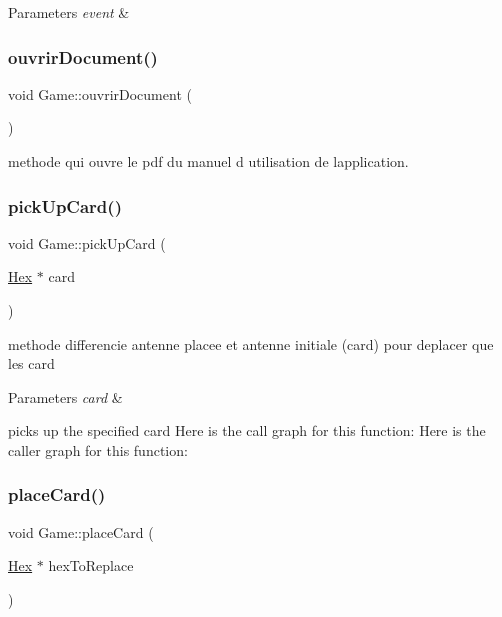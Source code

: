 \begin{DoxyParams}{Parameters}
{\em event} & \\
\hline
\end{DoxyParams}
\mbox{\label{class_game_a2891d0920da38ccdc2df9a4b441ba084}} 
\subsubsection{\texorpdfstring{ouvrirDocument()}{ouvrirDocument()}}
{\footnotesize\ttfamily void Game\+::ouvrir\+Document (\begin{DoxyParamCaption}{ }\end{DoxyParamCaption})}



methode qui ouvre le pdf du manuel d utilisation de l\textquotesingle{}application. 

\mbox{\label{class_game_af01f609e7ecc9681f63a8849eb82ef18}} 
\subsubsection{\texorpdfstring{pickUpCard()}{pickUpCard()}}
{\footnotesize\ttfamily void Game\+::pick\+Up\+Card (\begin{DoxyParamCaption}\item[{\mbox{\hyperlink{class_hex}{Hex}} $\ast$}]{card }\end{DoxyParamCaption})}



methode differencie antenne placee et antenne initiale (card) pour deplacer que les card 


\begin{DoxyParams}{Parameters}
{\em card} & \\
\hline
\end{DoxyParams}
picks up the specified card Here is the call graph for this function\+:
Here is the caller graph for this function\+:
\mbox{\label{class_game_a899968e870a05be0ca685138fbe12fda}} 
\subsubsection{\texorpdfstring{placeCard()}{placeCard()}}
{\footnotesize\ttfamily void Game\+::place\+Card (\begin{DoxyParamCaption}\item[{\mbox{\hyperlink{class_hex}{Hex}} $\ast$}]{hex\+To\+Replace }\end{DoxyParamCaption})}



